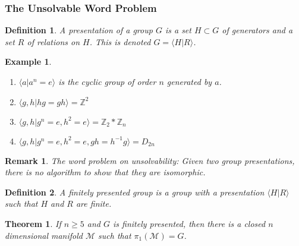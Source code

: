 \documentclass{article}
\theoremstyle{mystyle}
\newtheorem{theorem}{Theorem}[section]
\newtheorem{definition}{Definition}[section]
\newtheorem{example}{Example}[section]
\newtheorem{remark}{Remark}[section]
\begin{document}
\subsubsection{The Unsolvable Word Problem}
\begin{definition}
A presentation of a group $G$ is a set $H\subset G$ of generators and a set $R$ of relations on $H$. This is denoted $G = \langle H|R\rangle$.
\end{definition}
\begin{example}
\
\begin{enumerate}
    \item $\langle a | a^{n} = e\rangle$ is the cyclic group of order $n$ generated by $a$.
    \item $\langle g,h|hg = gh\rangle = \mathbb{Z}^{2}$
    \item $\langle g,h|g^{n} = e, h^{2} = e\rangle = \mathbb{Z}_{2}*\mathbb{Z}_{n}$
    \item $\langle g,h|g^{n} = e,h^{2} = e, gh=h^{-1}g\rangle = D_{2n}$
\end{enumerate}
\end{example}
\begin{remark}
The word problem on unsolvability: Given two group presentations, there is no algorithm to show that they are isomorphic.
\end{remark}
\begin{definition}
A finitely presented group is a group with a presentation $\langle H|R\rangle$ such that $H$ and $R$ are finite.
\end{definition}
\begin{theorem}
If $n\geq 5$ and $G$ is finitely presented, then there is a closed $n$ dimensional manifold $\mathcal{M}$ such that $\pi_{1}(\mathcal{M}) = G$.
\end{theorem}
\end{document}
